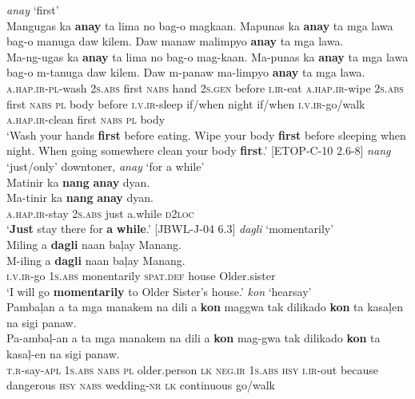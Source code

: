 \ea
\textit{anay} ‘first’ \\
    Mangugas  ka  \textbf{anay}  ta  lima  no  bag-o  magkaan. Mapunas  ka  \textbf{anay}  ta  mga  lawa  bag-o  manuga  daw  kilem. Daw  manaw  malimpyo        \textbf{anay}  ta  mga  lawa. \\\smallskip
 \gll Ma-ng-ugas  ka  \textbf{anay}  ta  lima  no  bag-o  mag-kaan. Ma-punas  ka  \textbf{anay}  ta  mga  lawa  bag-o  m-tanuga  daw  kilem. Daw  m-panaw  ma-limpyo        \textbf{anay}  ta  mga  lawa. \\
    \textsc{a.hap.ir}-\textsc{pl}-wash  2\textsc{s.abs}  first  \textsc{nabs}  hand  2\textsc{s.gen}  before  \textsc{i.ir}-eat       \textsc{a.hap.ir}-wipe  2\textsc{s.abs}  first  \textsc{nabs}  \textsc{pl}  body  before  \textsc{i.v.ir}-sleep  if/when  night if/when  \textsc{i.v.ir}-go/walk  \textsc{a.hap.ir}-clean  first  \textsc{nabs}  \textsc{pl}  body \\
    \glt `Wash your hands \textbf{first} before eating. Wipe your body \textbf{first} before sleeping when night. When going somewhere clean your body \textbf{first}.' [ETOP-C-10 2.6-8]
\z
\ea
\textit{nang} ‘just/only’ downtoner, \textit{anay} ‘for a while’ \\
Matinir  ka  \textbf{nang}  \textbf{anay}  dyan. \\\smallskip
 \gll Ma-tinir  ka  \textbf{nang}  \textbf{anay}  dyan. \\
\textsc{a.hap.ir}-stay  2\textsc{s.abs}  just  a.while  \textsc{d}2\textsc{loc} \\
\glt ‘\textbf{Just} stay there for \textbf{a} \textbf{while}.’ [JBWL-J-04 6.3]
\z
\ea
\textit{dagli} ‘momentarily’ \\
Miling  a  \textbf{dagli}  naan  baļay  Manang. \\\smallskip
 \gll M-iling  a  \textbf{dagli}  naan  baļay  Manang. \\
\textsc{i.v.ir}-go  1\textsc{s.abs}  monentarily  \textsc{spat.def}  house  Older.sister \\
\glt ‘I will go \textbf{momentarily} to Older Sister’s house.’
\z
\ea
\textit{kon} ‘hearsay’ \\
    Pambaļan  a  ta  mga  manakem  na  dili  a  \textbf{kon} maggwa tak  dilikado  \textbf{kon}  ta  kasaļen  na  sigi  panaw. \\\smallskip
 \gll Pa-ambaļ-an  a  ta  mga  manakem  na  dili  a  \textbf{kon} mag-gwa tak  dilikado  \textbf{kon}  ta  kasaļ-en  na  sigi  panaw. \\
        \textsc{t.r}-say-\textsc{apl}  1\textsc{s.abs}  \textsc{nabs}  \textsc{pl}  older.person  \textsc{lk}  \textsc{neg.ir}  1\textsc{s.abs}  \textsc{hsy}    \textsc{i.ir}-out because  dangerous  \textsc{hsy}  \textsc{nabs}  wedding-\textsc{nr}  \textsc{lk}  continuous  go/walk \\
